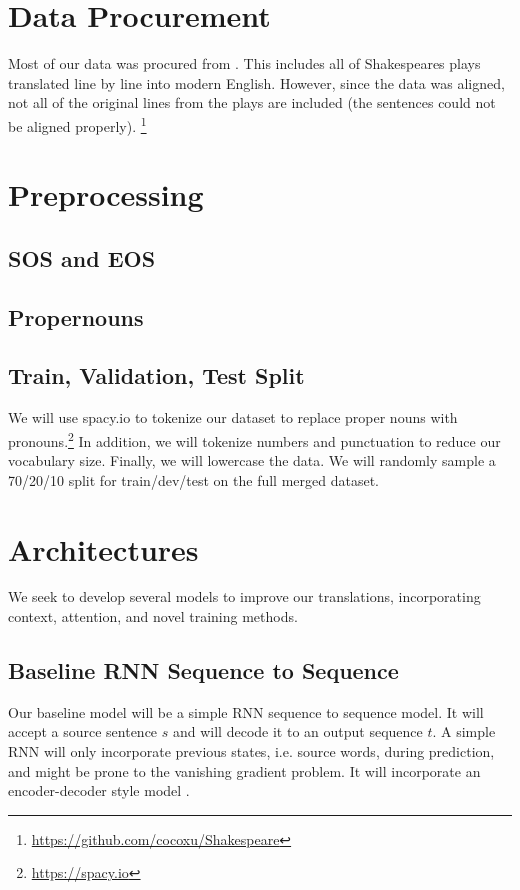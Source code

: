 \documentclass[twoside,twocolumn]{article}
\begin{document}
\section{Data Procurement}
Most of our data was procured from \cite{xu2012paraphrasing}.
This includes all of Shakespeares plays translated line by line into modern
English. However, since the data was aligned, not all of the original lines
from the plays are included (the sentences could not be aligned properly).
\footnote{\url{https://github.com/cocoxu/Shakespeare}}


\section{Preprocessing}
\subsection{SOS and EOS}

\subsection{Propernouns}

\subsection{Train, Validation, Test Split}

We will use spacy.io to tokenize our dataset to replace proper nouns with
pronouns.\footnote{\url{https://spacy.io}} In addition, we will tokenize
numbers and punctuation to reduce our vocabulary size. Finally, we will
lowercase the data. We will randomly sample a 70/20/10 split for train/dev/test
on the full merged dataset. %

\section{Architectures}
We seek to develop several models to improve our translations, incorporating
context, attention, and novel training methods.

\subsection{Baseline RNN Sequence to Sequence}
Our baseline model will be a simple RNN sequence to sequence model. It will
accept a source sentence $s$ and will decode it to an output sequence $t$.
A simple RNN will only incorporate previous states, i.e. source words, during
prediction, and might be prone to the vanishing gradient problem. It will
incorporate an encoder-decoder style model \cite{cho2014learning}
\cite{sutskever2014sequence}.
\end{document}
